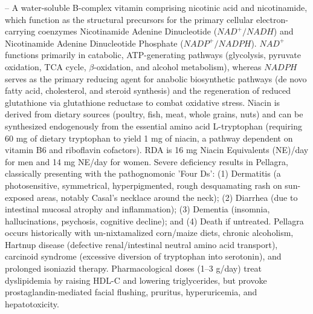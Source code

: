 -- A water-soluble B-complex vitamin comprising nicotinic acid and nicotinamide, which function as the structural precursors for the primary cellular electron-carrying coenzymes Nicotinamide Adenine Dinucleotide ($NAD^+/NADH$) and Nicotinamide Adenine Dinucleotide Phosphate ($NADP^+/NADPH$). $NAD^+$ functions primarily in catabolic, ATP-generating pathways (glycolysis, pyruvate oxidation, TCA cycle, $\beta$-oxidation, and alcohol metabolism), whereas $NADPH$ serves as the primary reducing agent for anabolic biosynthetic pathways (de novo fatty acid, cholesterol, and steroid synthesis) and the regeneration of reduced glutathione via glutathione reductase to combat oxidative stress. Niacin is derived from dietary sources (poultry, fish, meat, whole grains, nuts) and can be synthesized endogenously from the essential amino acid L-tryptophan (requiring 60 mg of dietary tryptophan to yield 1 mg of niacin, a pathway dependent on vitamin B6 and riboflavin cofactors). RDA is 16 mg Niacin Equivalents (NE)/day for men and 14 mg NE/day for women. Severe deficiency results in Pellagra, classically presenting with the pathognomonic 'Four Ds': (1) Dermatitis (a photosensitive, symmetrical, hyperpigmented, rough desquamating rash on sun-exposed areas, notably Casal's necklace around the neck); (2) Diarrhea (due to intestinal mucosal atrophy and inflammation); (3) Dementia (insomnia, hallucinations, psychosis, cognitive decline); and (4) Death if untreated. Pellagra occurs historically with un-nixtamalized corn/maize diets, chronic alcoholism, Hartnup disease (defective renal/intestinal neutral amino acid transport), carcinoid syndrome (excessive diversion of tryptophan into serotonin), and prolonged isoniazid therapy. Pharmacological doses (1--3 g/day) treat dyslipidemia by raising HDL-C and lowering triglycerides, but provoke prostaglandin-mediated facial flushing, pruritus, hyperuricemia, and hepatotoxicity.

